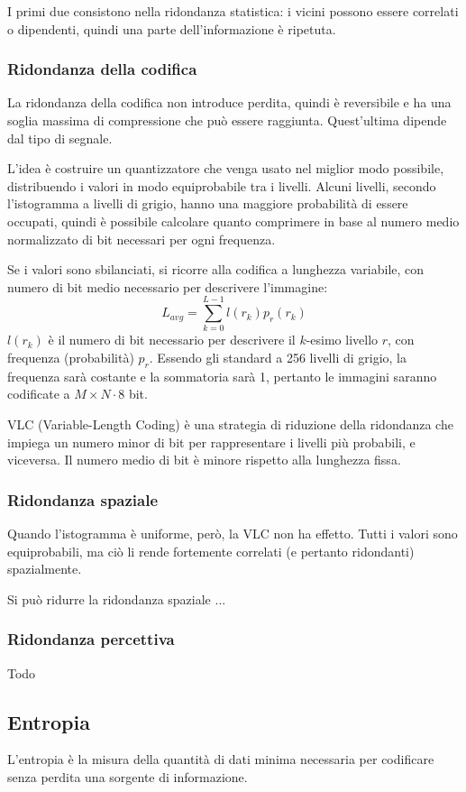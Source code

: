 I primi due consistono nella ridondanza statistica: i vicini possono essere correlati o dipendenti, quindi una parte dell'informazione è ripetuta. 

\subsubsection{Ridondanza della codifica}
La ridondanza della codifica non introduce perdita, quindi è reversibile e ha una soglia massima di compressione che può essere raggiunta. Quest'ultima dipende dal tipo di segnale.

L'idea è costruire un quantizzatore che venga usato nel miglior modo possibile, distribuendo i valori in modo equiprobabile tra i livelli. Alcuni livelli, secondo l'istogramma a livelli di grigio, hanno una maggiore probabilità di essere occupati, quindi è possibile calcolare quanto comprimere in base al numero medio normalizzato di bit necessari per ogni frequenza.

Se i valori sono sbilanciati, si ricorre alla codifica a lunghezza variabile, con numero di bit medio necessario per descrivere l'immagine:
$$L_{avg} = \sum_{k=0}^{L-1}l(r_k)p_r(r_k)$$
$l(r_k)$ è il numero di bit necessario per descrivere il $k$-esimo livello $r$, con frequenza (probabilità) $p_r$. Essendo gli standard a 256 livelli di grigio, la frequenza sarà costante e la sommatoria sarà 1, pertanto le immagini saranno codificate a $M\times N \cdot 8$ bit.

VLC (Variable-Length Coding) è una strategia di riduzione della ridondanza che impiega un numero minor di bit per rappresentare i livelli più probabili, e viceversa. Il numero medio di bit è minore rispetto alla lunghezza fissa.

\subsubsection{Ridondanza spaziale}
Quando l'istogramma è uniforme, però, la VLC non ha effetto. Tutti i valori sono equiprobabili, ma ciò li rende fortemente correlati (e pertanto ridondanti) spazialmente. 

Si può ridurre la ridondanza spaziale ...

\subsubsection{Ridondanza percettiva}
Todo

\subsection{Entropia}
L'entropia è la misura della quantità di dati minima necessaria per codificare senza perdita una sorgente di informazione.

